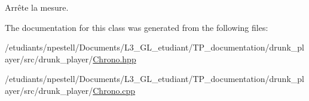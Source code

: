 Arrête la mesure. 



The documentation for this class was generated from the following files\+:\begin{DoxyCompactItemize}
\item 
/etudiants/npestell/\+Documents/\+L3\+\_\+\+G\+L\+\_\+etudiant/\+T\+P\+\_\+documentation/drunk\+\_\+player/src/drunk\+\_\+player/\hyperlink{Chrono_8hpp}{Chrono.\+hpp}\item 
/etudiants/npestell/\+Documents/\+L3\+\_\+\+G\+L\+\_\+etudiant/\+T\+P\+\_\+documentation/drunk\+\_\+player/src/drunk\+\_\+player/\hyperlink{Chrono_8cpp}{Chrono.\+cpp}\end{DoxyCompactItemize}
